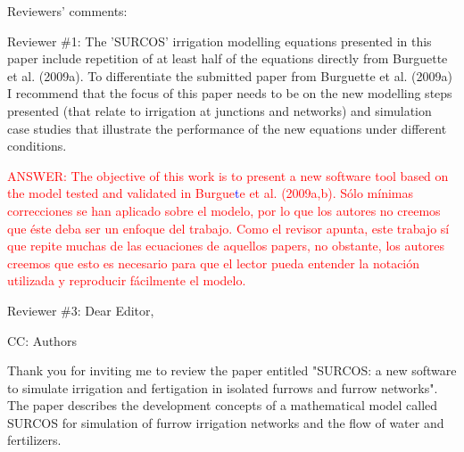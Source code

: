 \documentclass[a4paper]{article}
\begin{document}
%
%
%
%
%
%
%

Reviewers' comments:


Reviewer \#1: The 'SURCOS' irrigation modelling equations presented in this paper include repetition of at least half of the equations directly from Burguette et al. (2009a). To differentiate the submitted paper from Burguette et al. (2009a) I recommend that the focus of this paper needs to be on the new modelling steps presented (that relate to irrigation at junctions and networks) and simulation case studies that illustrate the performance of the new equations under different conditions.

\textcolor{red}{ANSWER: The objective of this work is to present a new software
tool based on the model tested and validated in
Burgue}\textcolor{blue}{t}\textcolor{red}{e et al. (2009a,b). Sólo mínimas
correcciones se han aplicado sobre el modelo, por lo que los autores no creemos
que éste deba ser un enfoque del trabajo. Como el revisor apunta, este trabajo
sí que repite muchas de las ecuaciones de aquellos papers, no obstante, los
autores creemos que esto es necesario para que el lector pueda entender la
notación utilizada y reproducir fácilmente el modelo.}

Reviewer \#3: Dear Editor,

CC: Authors

Thank you for inviting me to review the paper entitled "SURCOS: a new software to simulate irrigation and fertigation in isolated furrows and furrow networks".
The paper describes the development concepts of a mathematical model called SURCOS for simulation of furrow irrigation networks and the flow of water and fertilizers.
\end{document}
